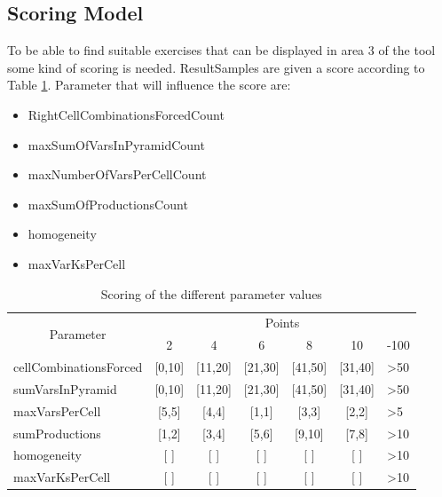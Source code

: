 \clearpage

\subsection{Scoring Model} \label{scoringModel}
To be able to find suitable exercises that can be displayed in area 3 of the tool some kind of scoring is needed. ResultSamples are given a score according to Table \ref{scoring}. Parameter that will influence the score are:
\begin{itemize}
	\item RightCellCombinationsForcedCount
	\item maxSumOfVarsInPyramidCount 	
	\item maxNumberOfVarsPerCellCount
	\item maxSumOfProductionsCount
	\item homogeneity
	\item maxVarKsPerCell
\end{itemize}
\begin{table}[H]
	\centering
	\begin{tabular}{|l|c|c|c|c|c|l|}
		\hline
		\multicolumn{1}{|c|}{\multirow{2}{*}{Parameter}} & \multicolumn{6}{c|}{Points}                                                          \\ \cline{2-7} 
		\multicolumn{1}{|c|}{}		& 2          & 4           & 6           & 8           & 10          & -100            \\ \hline
		cellCombinationsForced      & {[}0,10{]} & {[}11,20{]} & {[}21,30{]} & {[}41,50{]} & {[}31,40{]} & \textgreater 50 \\ \hline
		sumVarsInPyramid            & {[}0,10{]} & {[}11,20{]} & {[}21,30{]} & {[}41,50{]} & {[}31,40{]} & \textgreater 50 \\ \hline
		maxVarsPerCell              & {[}5,5{]}  & {[}4,4{]}   & {[}1,1{]}   & {[}3,3{]}   & {[}2,2{]}   & \textgreater 5  \\ \hline
		sumProductions              & {[}1,2{]}  & {[}3,4{]}   & {[}5,6{]}   & {[}9,10{]}  & {[}7,8{]}   & \textgreater 10 \\ \hline
		homogeneity 				& {[} {]}  & {[} {]}   & {[} {]}   & {[} {]}  & {[} {]}   & \textgreater 10 \\ \hline
		maxVarKsPerCell 			& {[} {]}  & {[} {]}   & {[} {]}   & {[} {]}  & {[} {]}   & \textgreater 10 \\ \hline
	\end{tabular}
	\caption{Scoring of the different parameter values}
	\label{scoring}
\end{table}



